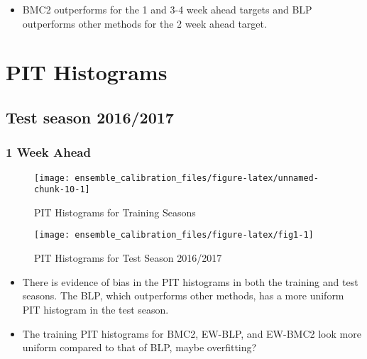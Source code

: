 \documentclass[
]{article}
\begin{document}
\begin{itemize}
\item BMC2 outperforms for the 1 and 3-4 week ahead targets and BLP outperforms other methods for the 2 week ahead target.
\end{itemize}

\newpage

\hypertarget{pit-histograms}{%
\section{PIT Histograms}\label{pit-histograms}}

\hypertarget{test-season-20162017}{%
\subsection{Test season 2016/2017}\label{test-season-20162017}}

\hypertarget{week-ahead}{%
\subsubsection{1 Week Ahead}\label{week-ahead}}

\begin{figure}[H]

{\centering \texttt{[image: ensemble\_calibration\_files/figure-latex/unnamed-chunk-10-1]} 

}

\caption{PIT Histograms for Training Seasons}\label{fig:unnamed-chunk-10}
\end{figure}

\newpage

\begin{figure}[H]

{\centering \texttt{[image: ensemble\_calibration\_files/figure-latex/fig1-1]} 

}

\caption{PIT Histograms for Test Season 2016/2017}\label{fig:fig1}
\end{figure}

\begin{itemize}
\item There is evidence of bias in the PIT histograms in both the training and test seasons. The BLP, which outperforms other methods, has a more uniform PIT histogram in the test season.
\item The training PIT histograms for BMC2, EW-BLP, and EW-BMC2 look more uniform compared to that of BLP, maybe overfitting?
\end{itemize}
\end{document}
